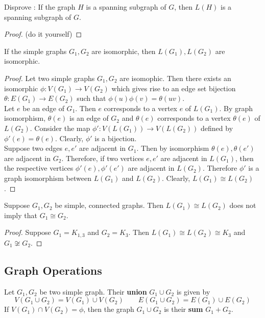 \begin{exercise}
	Disprove : If the graph $H$ is a spanning subgraph of $G$, then $L(H)$ is a spanning subgraph of $G$.
\end{exercise}
\begin{proof}
	(do it yourself)
\end{proof}

\begin{theorem}
	If the simple graphs $G_1,G_2$ are isomorphic, then $L(G_1),L(G_2)$ are isomorphic.
\end{theorem}
\begin{proof}
	Let two simple graphs $G_1,G_2$ are isomophic.
	Then there exists an isomorphic $\phi : V(G_1) \to V(G_2)$ which gives rise to an edge set bijection $\theta : E(G_1) \to E(G_2)$ such that $\phi(u)\phi(v) = \theta(uv)$.\\

	Let $e$ be an edge of $G_1$. Then $e$ corresponds to a vertex $e$ of $L(G_1)$. By graph isomorphism, $\theta(e)$ is an edge of $G_2$ and $\theta(e)$ corresponds to a vertex $\theta(e)$ of $L(G_2)$. Consider the map $\phi' : V(L(G_1)) \to V(L(G_2))$ defined by $\phi'(e) = \theta(e)$. Clearly, $\phi'$ is a bijection.\\

	Suppose two edges $e,e'$ are adjacent in $G_1$. Then by isomorphism $\theta(e),\theta(e')$ are adjacent in $G_2$. Therefore, if two vertices $e,e'$ are adjacent in $L(G_1)$, then the respective vertices $\phi'(e),\phi'(e')$ are adjacent in $L(G_2)$. Therefore $\phi'$ is a graph isomorphism between $L(G_1)$ and $L(G_2)$. Clearly, $L(G_1) \cong L(G_2)$.
\end{proof}

\begin{remark}
	Suppose $G_1,G_2$ be simple, connected graphs. Then $L(G_1) \cong L(G_2)$ does not imply that $G_1 \cong G_2$.
\end{remark}
\begin{proof}
	Suppose $G_1 = K_{1,3}$ and $G_2 = K_3$. Then $L(G_1) \cong L(G_2) \cong K_3$ and $G_1 \not\cong G_2$.
\end{proof}

\subsection{Graph Operations}
\begin{definition}
	Let $G_1,G_2$ be two simple graph.
	Their \textbf{union} $G_1 \cup G_2$ is given by 
	$$ V(G_1 \cup G_2) = V(G_1) \cup V(G_2) \qquad E(G_1 \cup G_2) = E(G_1) \cup E(G_2) $$
	If $V(G_1) \cap V(G_2) = \phi$, then the graph $G_1 \cup G_2$ is their \textbf{sum} $G_1 + G_2$.
\end{definition}

